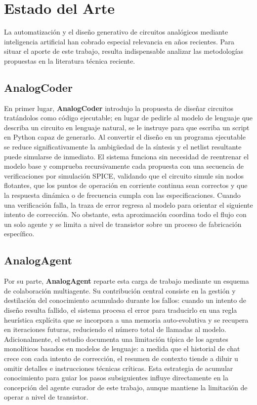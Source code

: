 \section*{Estado del Arte}
La automatización y el diseño generativo de circuitos analógicos mediante inteligencia artificial han cobrado especial relevancia en años recientes. Para situar el aporte de este trabajo, resulta indispensable analizar las metodologías propuestas en la literatura técnica reciente.

\subsection*{AnalogCoder}

En primer lugar, \textbf{AnalogCoder} \cite{analogcoder} introdujo la propuesta de diseñar circuitos tratándolos como código ejecutable; en lugar de pedirle al modelo de lenguaje que describa un circuito en lenguaje natural, se le instruye para que escriba un script en Python capaz de generarlo. Al convertir el diseño en un programa ejecutable se reduce significativamente la ambigüedad de la síntesis y el netlist resultante puede simularse de inmediato. El sistema funciona sin necesidad de reentrenar el modelo base y comprueba recursivamente cada propuesta con una secuencia de verificaciones por simulación SPICE, validando que el circuito simule sin nodos flotantes, que los puntos de operación en corriente continua sean correctos y que la respuesta dinámica o de frecuencia cumpla con las especificaciones. Cuando una verificación falla, la traza de error regresa al modelo para orientar el siguiente intento de corrección. No obstante, esta aproximación coordina todo el flujo con un solo agente y se limita a nivel de transistor sobre un proceso de fabricación específico.

\subsection*{AnalogAgent}

Por su parte, \textbf{AnalogAgent} \cite{analogagent} reparte esta carga de trabajo mediante un esquema de colaboración multiagente. Su contribución central consiste en la gestión y destilación del conocimiento acumulado durante los fallos: cuando un intento de diseño resulta fallido, el sistema procesa el error para traducirlo en una regla heurística explícita que se incorpora a una memoria auto-evolutiva y se recupera en iteraciones futuras, reduciendo el número total de llamadas al modelo. Adicionalmente, el estudio documenta una limitación típica de los agentes monolíticos basados en modelos de lenguaje: a medida que el historial de chat crece con cada intento de corrección, el resumen de contexto tiende a diluir u omitir detalles e instrucciones técnicas críticas. Esta estrategia de acumular conocimiento para guiar los pasos subsiguientes influye directamente en la concepción del agente curador de este trabajo, aunque mantiene la limitación de operar a nivel de transistor.

